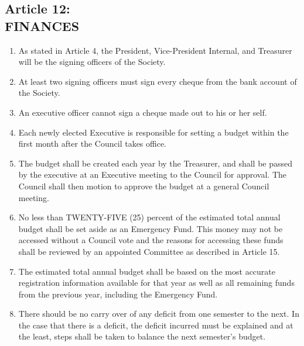 \documentclass[]{report}
\begin{document}
\clearpage
\begin{center}
	\section*{Article 12:\\FINANCES}
	\vspace{12px}
\end{center}
\label{finances}

	\renewcommand{\theenumi}{\Alph{enumi}}
	\begin{enumerate}
	
		\item As stated in Article 4, the President, Vice-President Internal, and Treasurer will be the signing officers of the Society.
		
		\item At least two signing officers must sign every cheque from the bank account of the Society.
		
		\item An executive officer cannot sign a cheque made out to his or her self.
		
		\item Each newly elected Executive is responsible for setting a budget within the first month after the Council takes office.
		
		\item The budget shall be created each year by the Treasurer, and shall be passed by the executive at an Executive meeting to the Council for approval. The Council shall then motion to approve the budget at a general Council meeting.
		
		\item No less than TWENTY-FIVE (25) percent of the estimated total annual budget shall be set aside as an Emergency Fund. This money may not be accessed without a Council vote and the reasons for accessing these funds shall be reviewed by an appointed Committee as described in Article 15.
		
		\item The estimated total annual budget shall be based on the most accurate registration information available for that year as well as all remaining funds from the previous year, including the Emergency Fund.
		
		\item There should be no carry over of any deficit from one semester to the next. In the case that there is a deficit, the deficit incurred must be explained and at the least, steps shall be taken to balance the next semester's budget.
		

\end{enumerate}
\end{document}
